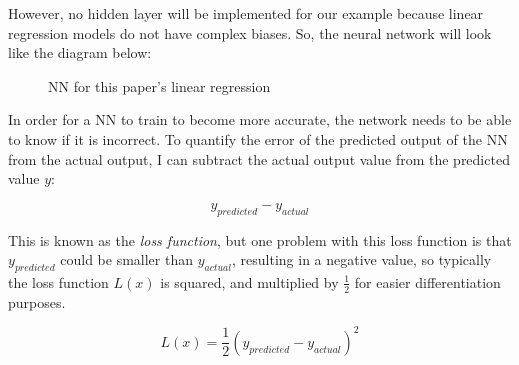 \documentclass[12pt]{article}
\theoremstyle{definition}
\begin{document}
However, no hidden layer will be implemented for our example because linear regression models do not have complex biases. So, the neural network will look like the diagram below:

\begin{figure}[h]
    \centering
    \caption{NN for this paper's linear regression}
    \label{fig:enter-label}
\end{figure}

In order for a NN to train to become more accurate, the network needs to be able to know if it is incorrect. To quantify the error of the predicted output of the NN from the actual output, I can subtract the actual output value from the predicted value $y$: 

\[y_{predicted} - y_{actual}\]

This is known as the \textit{loss function}, but one problem with this loss function is that $y_{predicted}$ could be smaller than $y_{actual}$, resulting in a negative value, so typically the loss function $L(x)$ is squared, and multiplied by $\frac{1}{2}$ for easier differentiation purposes.

\[L(x) = \frac{1}{2}(y_{predicted} - y_{actual})^2\]
\end{document}
